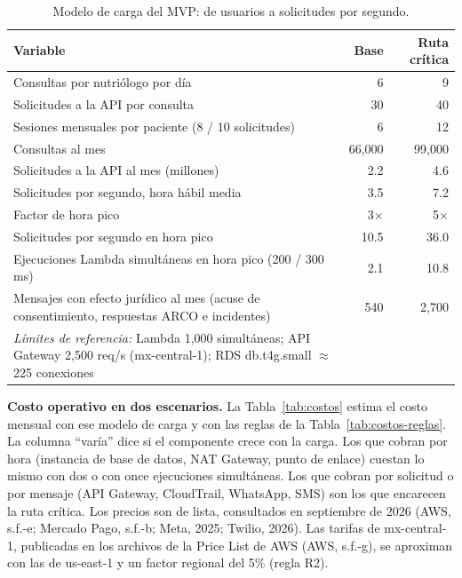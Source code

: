 \documentclass[12pt, a4paper]{article}
\begin{document}
\begin{table}[!htbp]
  \centering
  \caption{Modelo de carga del MVP: de usuarios a solicitudes por segundo.}
  \label{tab:carga}
  \footnotesize
  \begin{tabularx}{\textwidth}{X r r}
    \toprule
    \textbf{Variable} & \textbf{Base} & \textbf{Ruta crítica} \\
    \midrule
    Consultas por nutriólogo por día & 6 & 9 \\
    Solicitudes a la API por consulta & 30 & 40 \\
    Sesiones mensuales por paciente (8 / 10 solicitudes) & 6 & 12 \\
    Consultas al mes & 66,000 & 99,000 \\
    Solicitudes a la API al mes (millones) & 2.2 & 4.6 \\
    Solicitudes por segundo, hora hábil media & 3.5 & 7.2 \\
    Factor de hora pico & 3$\times$ & 5$\times$ \\
    Solicitudes por segundo en hora pico & 10.5 & 36.0 \\
    Ejecuciones Lambda simultáneas en hora pico (200 / 300 ms) & 2.1 & 10.8 \\
    Mensajes con efecto jurídico al mes (acuse de consentimiento, respuestas ARCO e incidentes) & 540 & 2,700 \\
    \midrule
    \textit{Límites de referencia:} Lambda 1,000 simultáneas; API Gateway 2,500 req/s (mx-central-1); RDS db.t4g.small $\approx$ 225 conexiones & & \\
    \bottomrule
  \end{tabularx}
\end{table}
 
\textbf{Costo operativo en dos escenarios.} La Tabla~\ref{tab:costos}
estima el costo mensual con ese modelo de carga y con las reglas de la
Tabla~\ref{tab:costos-reglas}. La columna ``varía'' dice si el componente
crece con la carga. Los que cobran por hora (instancia de base de datos,
NAT Gateway, punto de enlace) cuestan lo mismo con dos o con once
ejecuciones simultáneas. Los que cobran por solicitud o por mensaje (API
Gateway, CloudTrail, WhatsApp, SMS) son los que
encarecen la ruta crítica. Los precios son de lista, consultados en
septiembre de 2026 (AWS, s.f.-e; Mercado Pago, s.f.-b; Meta, 2025;
Twilio, 2026). Las tarifas de mx-central-1, publicadas en los archivos
de la Price List de AWS (AWS, s.f.-g), se aproximan con las de us-east-1
y un factor regional del 5\% (regla R2).
 
\end{document}
